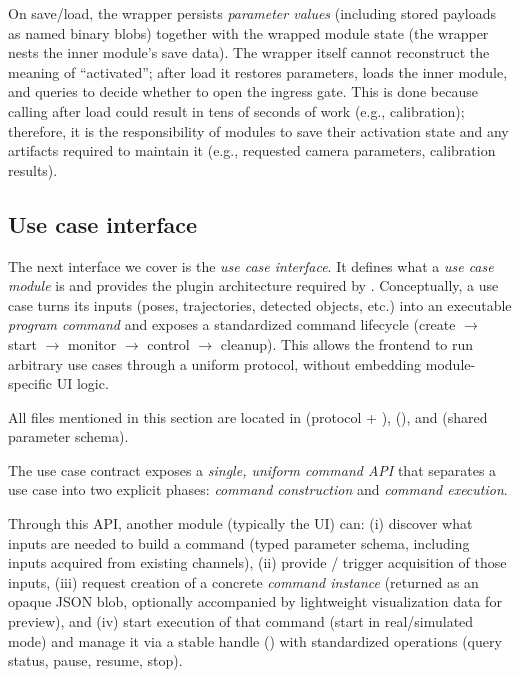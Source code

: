 On save/load, the wrapper persists \emph{parameter values} (including stored  payloads as named binary blobs) together with the wrapped module state (the wrapper nests the inner module's save data). The wrapper itself cannot reconstruct the meaning of ``activated''; after load it restores parameters, loads the inner module, and queries  to decide whether to open the ingress gate. This is done because calling  after load could result in tens of seconds of work (e.g., calibration); therefore, it is the responsibility of modules to save their activation state and any artifacts required to maintain it (e.g., requested camera parameters, calibration results).


\subsection{Use case interface} \label{sec:ch3_usecase_wrapper}

The next interface we cover is the \emph{use case interface}. It defines what a \emph{use case module} is and provides the plugin architecture required by . Conceptually, a use case turns its inputs (poses, trajectories, detected objects, etc.) into an executable \emph{program command} and exposes a standardized command lifecycle (create $\rightarrow$ start $\rightarrow$ monitor $\rightarrow$ control $\rightarrow$ cleanup). This allows the frontend to run arbitrary use cases through a uniform protocol, without embedding module-specific UI logic.

All files mentioned in this section are located in  (protocol + ),  (), and  (shared parameter schema).

The use case contract exposes a \emph{single, uniform command API} that separates a use case into two explicit phases: \emph{command construction} and \emph{command execution}.

Through this API, another module (typically the UI) can:
(i) discover what inputs are needed to build a command (typed parameter schema, including  inputs acquired from existing channels),
(ii) provide / trigger acquisition of those inputs,
(iii) request creation of a concrete \emph{command instance} (returned as an opaque JSON blob, optionally accompanied by lightweight visualization data for preview), and
(iv) start execution of that command (start in real/simulated mode) and manage it via a stable handle () with standardized operations (query status, pause, resume, stop).

